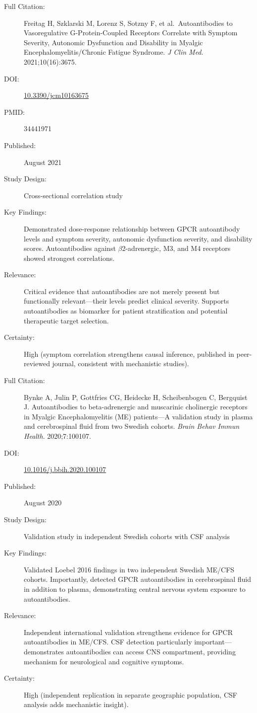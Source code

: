 \begin{description}
    \item[Full Citation:] Freitag H, Szklarski M, Lorenz S, Sotzny F, et al.\ Autoantibodies to Vasoregulative G-Protein-Coupled Receptors Correlate with Symptom Severity, Autonomic Dysfunction and Disability in Myalgic Encephalomyelitis/Chronic Fatigue Syndrome. \textit{J Clin Med}. 2021;10(16):3675.
    \item[DOI:] \href{https://doi.org/10.3390/jcm10163675}{10.3390/jcm10163675}
    \item[PMID:] 34441971
    \item[Published:] August 2021
    \item[Study Design:] Cross-sectional correlation study
    \item[Key Findings:] Demonstrated dose-response relationship between GPCR autoantibody levels and symptom severity, autonomic dysfunction severity, and disability scores. Autoantibodies against $\beta$2-adrenergic, M3, and M4 receptors showed strongest correlations.
    \item[Relevance:] Critical evidence that autoantibodies are not merely present but functionally relevant---their levels predict clinical severity. Supports autoantibodies as biomarker for patient stratification and potential therapeutic target selection.
    \item[Certainty:] High (symptom correlation strengthens causal inference, published in peer-reviewed journal, consistent with mechanistic studies).
\end{description}

\begin{description}
    \item[Full Citation:] Bynke A, Julin P, Gottfries CG, Heidecke H, Scheibenbogen C, Bergquist J. Autoantibodies to beta-adrenergic and muscarinic cholinergic receptors in Myalgic Encephalomyelitis (ME) patients---A validation study in plasma and cerebrospinal fluid from two Swedish cohorts. \textit{Brain Behav Immun Health}. 2020;7:100107.
    \item[DOI:] \href{https://doi.org/10.1016/j.bbih.2020.100107}{10.1016/j.bbih.2020.100107}
    \item[Published:] August 2020
    \item[Study Design:] Validation study in independent Swedish cohorts with CSF analysis
    \item[Key Findings:] Validated Loebel 2016 findings in two independent Swedish ME/CFS cohorts. Importantly, detected GPCR autoantibodies in cerebrospinal fluid in addition to plasma, demonstrating central nervous system exposure to autoantibodies.
    \item[Relevance:] Independent international validation strengthens evidence for GPCR autoantibodies in ME/CFS. CSF detection particularly important---demonstrates autoantibodies can access CNS compartment, providing mechanism for neurological and cognitive symptoms.
    \item[Certainty:] High (independent replication in separate geographic population, CSF analysis adds mechanistic insight).
\end{description}

